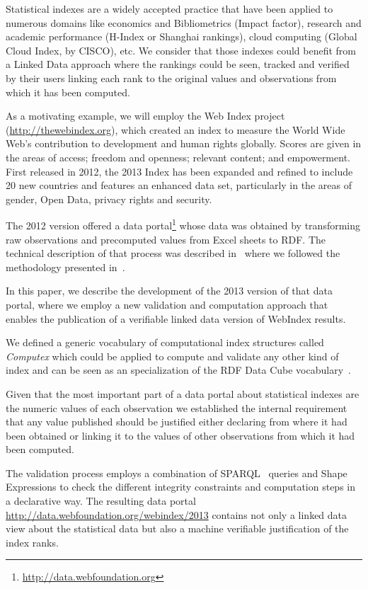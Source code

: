 \documentclass{llncs}
\newcommand{\footnoteUrl}[1]{\footnote{\url{#1}}}
\begin{document}
Statistical indexes are a widely accepted practice that have been applied 
to numerous domains like economics and Bibliometrics (Impact factor), 
research and academic performance (H-Index or Shanghai rankings), 
cloud computing (Global Cloud Index, by CISCO), 
etc. 
We consider that those indexes could benefit from a 
 Linked Data approach where the rankings could be seen, tracked and 
 verified by their users linking each rank to the original values and observations 
 from which it has been computed.

As a motivating example, we will employ the Web Index project
(\url{http://thewebindex.org}), which created an index to measure the World Wide Web’s 
contribution to development and human rights globally. Scores are given in the areas of access; freedom and openness; relevant content; and empowerment. 
First released in 2012, the 2013 Index has been expanded and refined to include 20 new countries and features an enhanced data set, particularly in the areas of gender, Open Data, privacy rights and security.

The 2012 version offered a data
portal\footnoteUrl{http://data.webfoundation.org} whose data was obtained 
by transforming raw observations and precomputed values 
from Excel sheets to RDF. 
The technical description of that process was described in~\cite{Alvarez13} where we followed
the methodology presented in~\cite{Silva11}. 

In this paper, we describe the development of the 2013 version of that data portal, where we employ 
a new validation and computation approach that enables the publication of a verifiable linked data version of WebIndex results.

We defined a generic vocabulary 
of computational index structures called \emph{Computex} which could be applied to compute 
and validate any other kind of index and can be seen as an specialization of the RDF Data Cube vocabulary~\cite{Cube}.

Given that the most important part of a data portal about statistical indexes are the 
numeric values of each observation we established the internal requirement that any value published should be justified either declaring from where it had been obtained or
linking it to the values of other observations
from which it had been computed.

The validation process employs a combination of SPARQL~\cite{SPARQL11} queries and Shape Expressions \cite{Boneva2014} to check the 
 different integrity constraints and computation steps in a declarative way.
The resulting data portal \url{http://data.webfoundation.org/webindex/2013} contains not only a linked data view about the statistical data but also a machine verifiable justification of the index ranks.
\end{document}
